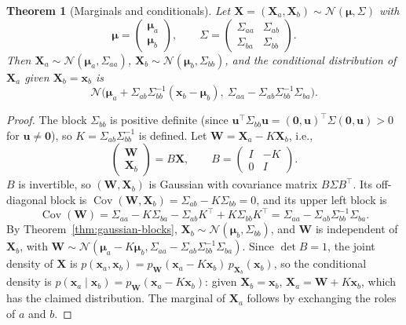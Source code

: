 \documentclass[11pt]{article}
\DeclareMathOperator{\Cov}{Cov}
\theoremstyle{definition}
\theoremstyle{plain}
\newtheorem{theorem}[definition]{Theorem}
\theoremstyle{remark}
\begin{document}
\begin{theorem}[Marginals and conditionals]\label{thm:gaussian-conditional}
    Let $\mathbf{X} = (\mathbf{X}_a, \mathbf{X}_b) \sim \mathcal{N}(\boldsymbol{\mu}, \Sigma)$ with
    \[\boldsymbol{\mu} = \begin{pmatrix} \boldsymbol{\mu}_a \\ \boldsymbol{\mu}_b \end{pmatrix}, \qquad \Sigma = \begin{pmatrix} \Sigma_{aa} & \Sigma_{ab} \\ \Sigma_{ba} & \Sigma_{bb} \end{pmatrix}.\]
    Then $\mathbf{X}_a \sim \mathcal{N}(\boldsymbol{\mu}_a, \Sigma_{aa})$, $\mathbf{X}_b \sim \mathcal{N}(\boldsymbol{\mu}_b, \Sigma_{bb})$, and the conditional distribution of $\mathbf{X}_a$ given $\mathbf{X}_b = \mathbf{x}_b$ is
    \[\mathcal{N}\big(\boldsymbol{\mu}_a + \Sigma_{ab}\Sigma_{bb}^{-1}(\mathbf{x}_b - \boldsymbol{\mu}_b), \ \Sigma_{aa} - \Sigma_{ab}\Sigma_{bb}^{-1}\Sigma_{ba}\big).\]
\end{theorem}

\begin{proof}
    The block $\Sigma_{bb}$ is positive definite (since $\mathbf{u}^\top\Sigma_{bb}\mathbf{u} = (\mathbf{0}, \mathbf{u})^\top\Sigma(\mathbf{0}, \mathbf{u}) > 0$ for $\mathbf{u} \neq \mathbf{0}$), so $K = \Sigma_{ab}\Sigma_{bb}^{-1}$ is defined. Let $\mathbf{W} = \mathbf{X}_a - K\mathbf{X}_b$, i.e.,
    \[\begin{pmatrix} \mathbf{W} \\ \mathbf{X}_b \end{pmatrix} = B\mathbf{X}, \qquad B = \begin{pmatrix} I & -K \\ 0 & I \end{pmatrix}.\]
    $B$ is invertible, so $(\mathbf{W}, \mathbf{X}_b)$ is Gaussian with covariance matrix $B\Sigma B^\top$. Its off-diagonal block is $\Cov(\mathbf{W}, \mathbf{X}_b) = \Sigma_{ab} - K\Sigma_{bb} = 0$, and its upper left block is
    \[\Cov(\mathbf{W}) = \Sigma_{aa} - K\Sigma_{ba} - \Sigma_{ab}K^\top + K\Sigma_{bb}K^\top = \Sigma_{aa} - \Sigma_{ab}\Sigma_{bb}^{-1}\Sigma_{ba}.\]
    By Theorem~\ref{thm:gaussian-blocks}, $\mathbf{X}_b \sim \mathcal{N}(\boldsymbol{\mu}_b, \Sigma_{bb})$, and $\mathbf{W}$ is independent of $\mathbf{X}_b$, with $\mathbf{W} \sim \mathcal{N}(\boldsymbol{\mu}_a - K\boldsymbol{\mu}_b, \Sigma_{aa} - \Sigma_{ab}\Sigma_{bb}^{-1}\Sigma_{ba})$. Since $\det B = 1$, the joint density of $\mathbf{X}$ is $p(\mathbf{x}_a, \mathbf{x}_b) = p_{\mathbf{W}}(\mathbf{x}_a - K\mathbf{x}_b)\,p_{\mathbf{X}_b}(\mathbf{x}_b)$, so the conditional density is $p(\mathbf{x}_a \mid \mathbf{x}_b) = p_{\mathbf{W}}(\mathbf{x}_a - K\mathbf{x}_b)$: given $\mathbf{X}_b = \mathbf{x}_b$, $\mathbf{X}_a = \mathbf{W} + K\mathbf{x}_b$, which has the claimed distribution. The marginal of $\mathbf{X}_a$ follows by exchanging the roles of $a$ and $b$.
\end{proof}
\end{document}
